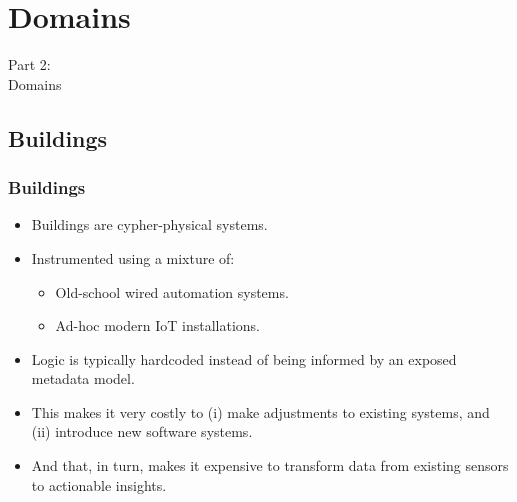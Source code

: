 \section{Domains}
\begin{frame}
    \vspace{25mm}
    \begin{center}
        \Huge{Part 2:\\Domains}
    \end{center}
\end{frame}

\subsection{Buildings}
\begin{frame}
    \frametitle{Buildings}
    \vspace{3mm}
    \begin{itemize}
        \item Buildings are cypher-physical systems.
        \item Instrumented using a mixture of:
          \begin{itemize}
            \item Old-school wired automation systems.
            \item Ad-hoc modern IoT installations.
          \end{itemize}
        \item Logic is typically hardcoded instead of being informed by an exposed metadata model.
        \item This makes it very costly to (i) make adjustments to existing systems, and (ii) introduce new software systems.
        \item And that, in turn, makes it expensive to transform data from existing sensors to actionable insights.
    \end{itemize}
\end{frame}

